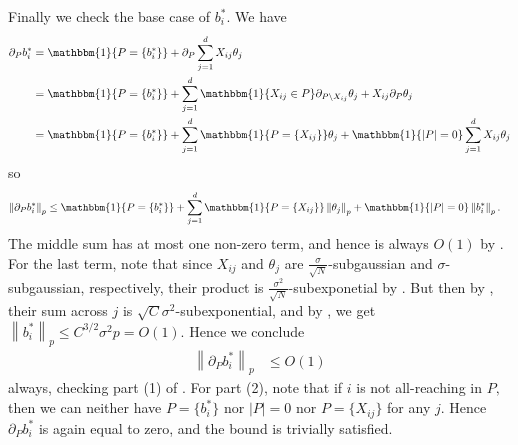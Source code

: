\documentclass{article}
\newcommand{\1}{\mathbbm{1}}
\newcommand{\norm}[1]{\left\lVert#1\right\rVert}
\theoremstyle{plain}
\theoremstyle{definition}
\theoremstyle{remark}
\begin{document}
Finally we check the base case of $b_i^*.$ We have 
\begin{align*}
    \partial_P b_i^* &= \1\{P = \{b_i^*\}\} + \partial_P \sum_{j=1}^d X_{ij}\theta_j \\
    &= \1\{P = \{b_i^*\}\} +\sum_{j=1}^d\1\{X_{ij}\in P\}\partial_{P\setminus X_{ij}}\theta_j + X_{ij}\partial_P \theta_j \\
    &= \1\{P = \{b_i^*\}\} +\sum_{j=1}^d \1\{P = \{X_{ij}\}\} \theta_j + \1\{|P|=0\}\sum_{j=1}^d X_{ij}\theta_j
\end{align*}
so 
\begin{align*}
    \norm{\partial_P b_i^* }_p &\leq \1\{P = \{b_i^*\}\} + \sum_{j=1}^d \1\{P = \{X_{ij}\}\} \norm{\theta_j}_p + \1\{|P|=0\}\norm{b_i^*}_p.
\end{align*}
The middle sum has at most one non-zero term, and hence is always $O(1)$ by . For the last term, note that since $X_{ij}$ and $\theta_j$ are $\frac{\sigma}{\sqrt{N}}$-subgaussian and $\sigma$-subgaussian, respectively, their product is $\frac{\sigma^2}{\sqrt{N}}$-subexponetial by . But then by , their sum across $j$ is $\sqrt{C} \sigma^2$-subexponential, and by , we get $\norm{b_i^*}_{p}\leq C^{3/2} \sigma^2 p = O(1).$ Hence we conclude 
\begin{align*}
    \norm{\partial_P b_i^* }_p &\leq O(1)
\end{align*}
always, checking part (1) of . For part (2), note that if $i$ is not all-reaching in $P,$ then we can neither have $P = \{b_i^*\}$ nor $|P|=0$ nor $P = \{X_{ij}\}$ for any $j$. Hence $\partial_P b_i^*$ is again equal to zero, and the bound is trivially satisfied.
\end{document}
